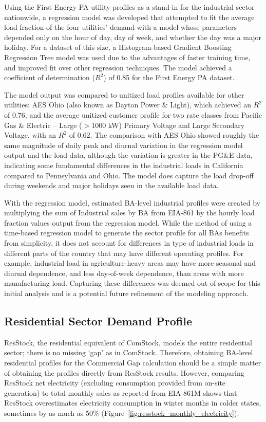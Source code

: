 Using the First Energy PA utility profiles as a stand-in for the industrial sector nationwide, a regression model was developed that attempted to fit the average load fraction of the four utilities’ demand with a model whose parameters depended only on the hour of day, day of week, and whether the day was a major holiday. For a dataset of this size, a Histogram-based Gradient Boosting Regression Tree model was used due to the advantages of faster training time, and improved fit over other regression techniques. The model achieved a coefficient of determination ($R^2$) of 0.85 for the First Energy PA dataset.

The model output was compared to unitized load profiles available for other utilities: AES Ohio (also known as Dayton Power \& Light), which achieved an $R^2$ of 0.76, and the average unitized customer profile for two rate classes from Pacific Gas \& Electric -- Large ($>$1000 kW) Primary Voltage and Large Secondary Voltage, with an $R^2$ of 0.62. The comparison with AES Ohio showed roughly the same magnitude of daily peak and diurnal variation in the regression model output and the load data, although the variation is greater in the PG\&E data, indicating some fundamental differences in the industrial loads in California compared to Pennsylvania and Ohio. The model does capture the load drop-off during weekends and major holidays seen in the available load data.

With the regression model, estimated BA-level industrial profiles were created by multiplying the sum of Industrial sales by BA from EIA-861 by the hourly load fraction values output from the regression model. 
While the method of using a time-based regression model to generate the sector profile for all BAs benefits from simplicity, it does not account for differences in type of industrial loads in different parts of the country that may have different operating profiles. For example, industrial load in agriculture-heavy areas may have more seasonal and diurnal dependence, and less day-of-week dependence, than areas with more manufacturing load. Capturing these differences was deemed out of scope for this initial analysis and is a potential future refinement of the modeling approach.

\subsection{Residential Sector Demand Profile}
ResStock, the residential equivalent of ComStock, models the entire residential sector; there is no missing ‘gap’ as in ComStock. Therefore, obtaining BA-level residential profiles for the Commercial Gap calculation should be a simple matter of obtaining the profiles directly from ResStock results. However, comparing ResStock net electricity (excluding consumption provided from on-site generation) to total monthly sales as reported from EIA-861M shows that ResStock overestimates electricity consumption in winter months in colder states, sometimes by as much as 50\% (Figure~\ref{fig:resstock_monthly_electricity}).

